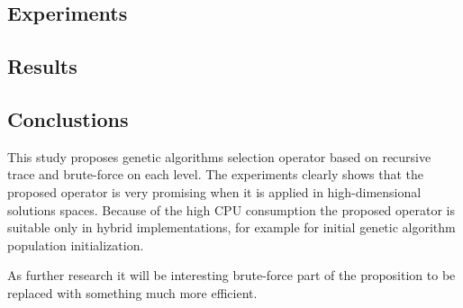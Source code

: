 \documentclass[a0,portrait,25pt]{sciposter}
\begin{document}
\begin{multicols}{3}

\begin{mdframed}[backgroundcolor=white,roundcorner=4pt,shadow=true,linewidth=1pt] \color{Black}

\section*{Experiments}

\end{mdframed}

\begin{mdframed}[backgroundcolor=white,roundcorner=4pt,shadow=true,linewidth=1pt] \color{Black}

\section*{Results}
\begin{minipage}[c]{1\linewidth}
\end{minipage}
\end{mdframed}

\begin{mdframed}[backgroundcolor=white,roundcorner=4pt,shadow=true,linewidth=1pt] \color{Black}

\section*{Conclustions}
This study proposes genetic algorithms selection operator based on recursive trace and brute-force on each level. The experiments clearly shows that the proposed operator is very promising when it is applied in high-dimensional solutions spaces. Because of the high CPU consumption the proposed operator is suitable only in hybrid implementations, for example for initial genetic algorithm population initialization. 

As further research it will be interesting brute-force part of the proposition to be replaced with something much more efficient. 
\end{mdframed}

\begin{mdframed}[backgroundcolor=white,roundcorner=4pt,shadow=true,linewidth=1pt] \color{Black}


\end{mdframed}
\end{multicols}
\end{document}
